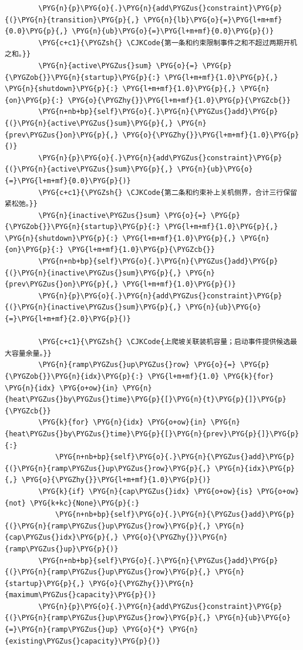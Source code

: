 \begin{Verbatim}
        \PYG{n}{p}\PYG{o}{.}\PYG{n}{add\PYGZus{}constraint}\PYG{p}{(}\PYG{n}{transition}\PYG{p}{,} \PYG{n}{lb}\PYG{o}{=}\PYG{l+m+mf}{0.0}\PYG{p}{,} \PYG{n}{ub}\PYG{o}{=}\PYG{l+m+mf}{0.0}\PYG{p}{)}
        \PYG{c+c1}{\PYGZsh{} \CJKCode{第一条和约束限制事件之和不超过两期开机之和。}}
        \PYG{n}{active\PYGZus{}sum} \PYG{o}{=} \PYG{p}{\PYGZob{}}\PYG{n}{startup}\PYG{p}{:} \PYG{l+m+mf}{1.0}\PYG{p}{,} \PYG{n}{shutdown}\PYG{p}{:} \PYG{l+m+mf}{1.0}\PYG{p}{,} \PYG{n}{on}\PYG{p}{:} \PYG{o}{\PYGZhy{}}\PYG{l+m+mf}{1.0}\PYG{p}{\PYGZcb{}}
        \PYG{n+nb+bp}{self}\PYG{o}{.}\PYG{n}{\PYGZus{}add}\PYG{p}{(}\PYG{n}{active\PYGZus{}sum}\PYG{p}{,} \PYG{n}{prev\PYGZus{}on}\PYG{p}{,} \PYG{o}{\PYGZhy{}}\PYG{l+m+mf}{1.0}\PYG{p}{)}
        \PYG{n}{p}\PYG{o}{.}\PYG{n}{add\PYGZus{}constraint}\PYG{p}{(}\PYG{n}{active\PYGZus{}sum}\PYG{p}{,} \PYG{n}{ub}\PYG{o}{=}\PYG{l+m+mf}{0.0}\PYG{p}{)}
        \PYG{c+c1}{\PYGZsh{} \CJKCode{第二条和约束补上关机侧界，合计三行保留紧松弛。}}
        \PYG{n}{inactive\PYGZus{}sum} \PYG{o}{=} \PYG{p}{\PYGZob{}}\PYG{n}{startup}\PYG{p}{:} \PYG{l+m+mf}{1.0}\PYG{p}{,} \PYG{n}{shutdown}\PYG{p}{:} \PYG{l+m+mf}{1.0}\PYG{p}{,} \PYG{n}{on}\PYG{p}{:} \PYG{l+m+mf}{1.0}\PYG{p}{\PYGZcb{}}
        \PYG{n+nb+bp}{self}\PYG{o}{.}\PYG{n}{\PYGZus{}add}\PYG{p}{(}\PYG{n}{inactive\PYGZus{}sum}\PYG{p}{,} \PYG{n}{prev\PYGZus{}on}\PYG{p}{,} \PYG{l+m+mf}{1.0}\PYG{p}{)}
        \PYG{n}{p}\PYG{o}{.}\PYG{n}{add\PYGZus{}constraint}\PYG{p}{(}\PYG{n}{inactive\PYGZus{}sum}\PYG{p}{,} \PYG{n}{ub}\PYG{o}{=}\PYG{l+m+mf}{2.0}\PYG{p}{)}

        \PYG{c+c1}{\PYGZsh{} \CJKCode{上爬坡关联装机容量；启动事件提供候选最大容量余量。}}
        \PYG{n}{ramp\PYGZus{}up\PYGZus{}row} \PYG{o}{=} \PYG{p}{\PYGZob{}}\PYG{n}{idx}\PYG{p}{:} \PYG{l+m+mf}{1.0} \PYG{k}{for} \PYG{n}{idx} \PYG{o+ow}{in} \PYG{n}{heat\PYGZus{}by\PYGZus{}time}\PYG{p}{[}\PYG{n}{t}\PYG{p}{]}\PYG{p}{\PYGZcb{}}
        \PYG{k}{for} \PYG{n}{idx} \PYG{o+ow}{in} \PYG{n}{heat\PYGZus{}by\PYGZus{}time}\PYG{p}{[}\PYG{n}{prev}\PYG{p}{]}\PYG{p}{:}
            \PYG{n+nb+bp}{self}\PYG{o}{.}\PYG{n}{\PYGZus{}add}\PYG{p}{(}\PYG{n}{ramp\PYGZus{}up\PYGZus{}row}\PYG{p}{,} \PYG{n}{idx}\PYG{p}{,} \PYG{o}{\PYGZhy{}}\PYG{l+m+mf}{1.0}\PYG{p}{)}
        \PYG{k}{if} \PYG{n}{cap\PYGZus{}idx} \PYG{o+ow}{is} \PYG{o+ow}{not} \PYG{k+kc}{None}\PYG{p}{:}
            \PYG{n+nb+bp}{self}\PYG{o}{.}\PYG{n}{\PYGZus{}add}\PYG{p}{(}\PYG{n}{ramp\PYGZus{}up\PYGZus{}row}\PYG{p}{,} \PYG{n}{cap\PYGZus{}idx}\PYG{p}{,} \PYG{o}{\PYGZhy{}}\PYG{n}{ramp\PYGZus{}up}\PYG{p}{)}
        \PYG{n+nb+bp}{self}\PYG{o}{.}\PYG{n}{\PYGZus{}add}\PYG{p}{(}\PYG{n}{ramp\PYGZus{}up\PYGZus{}row}\PYG{p}{,} \PYG{n}{startup}\PYG{p}{,} \PYG{o}{\PYGZhy{}}\PYG{n}{maximum\PYGZus{}capacity}\PYG{p}{)}
        \PYG{n}{p}\PYG{o}{.}\PYG{n}{add\PYGZus{}constraint}\PYG{p}{(}\PYG{n}{ramp\PYGZus{}up\PYGZus{}row}\PYG{p}{,} \PYG{n}{ub}\PYG{o}{=}\PYG{n}{ramp\PYGZus{}up} \PYG{o}{*} \PYG{n}{existing\PYGZus{}capacity}\PYG{p}{)}


\end{Verbatim}
